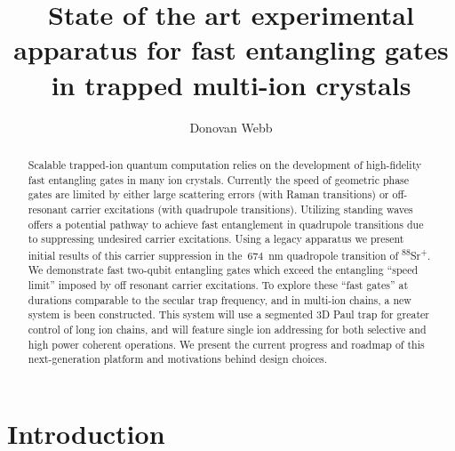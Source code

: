 \documentclass[12pt]{iopart}
\begin{document}
\title[]{State of the art experimental apparatus for fast entangling gates in trapped multi-ion crystals}

\author{Donovan Webb}

\address{Department of Physics,
University of Oxford}

\begin{abstract}

    Scalable trapped-ion quantum computation relies on the development
    of high-fidelity fast entangling gates in many ion crystals.
    Currently the speed of geometric phase gates are limited by either large
    scattering errors (with Raman transitions) or off-resonant carrier
    excitations (with quadrupole transitions).
    Utilizing standing waves offers a potential pathway to achieve
    fast entanglement in quadrupole transitions due to suppressing
    undesired carrier excitations.
    Using a legacy apparatus we present initial results of this
    carrier suppression in the~$674$~nm quadropole transition of
    \textsuperscript{88}Sr\textsuperscript{+}. We demonstrate
    fast two-qubit entangling gates which exceed the entangling ``speed
    limit'' imposed by off resonant carrier excitations.
    To explore these ``fast gates'' at durations comparable to the
    secular trap frequency, and in multi-ion chains, a new system is
    been constructed. This system will use a segmented 3D Paul trap
    for greater control of long ion chains, and will feature single
    ion addressing for both selective and high power coherent
    operations.  We present the current progress and roadmap of this
    next-generation platform and motivations behind design choices.

\end{abstract}

\section{Introduction}
\end{document}
